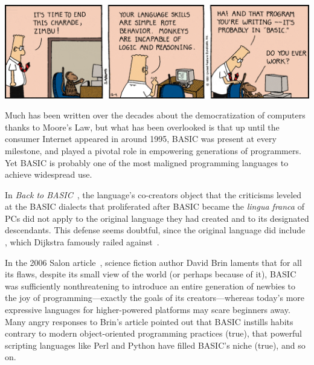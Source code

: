 

\includegraphics[width=\textwidth]{figs/dilbert-1991-12-04.png}



Much has been written over the decades about the democratization of
computers thanks to Moore's Law, but what has been overlooked is that up
until the consumer Internet appeared in around 1995, BASIC was present
at every milestone, and played a pivotal role in empowering generations
of programmers.
Yet BASIC is probably one of the most maligned programming languages
to achieve widespread use.

In \emph{Back to BASIC}~\cite{backtobasic}, the language's co-creators
object that the criticisms leveled at the 
BASIC dialects that proliferated after BASIC became the
\emph{lingua franca} of PCs did not apply to the original language
they had created and to its designated descendants.
This defense seems doubtful, since the original language did include
, which Dijkstra famously railed
against~\cite{goto_considered_harmful}.

In the 2006 Salon article~\cite{why_johnny_cant_code},
science fiction author David Brin laments that for all its flaws, 
despite its small view of the world (or perhaps because of it), BASIC
was sufficiently nonthreatening to introduce an entire generation of
newbies to the joy of programming---exactly the goals of its
creators---whereas today's more expressive languages for higher-powered
platforms may scare beginners away.
Many angry responses to Brin's article pointed out that BASIC
instills habits contrary to modern object-oriented programming practices (true),
that powerful scripting languages like Perl and Python have filled BASIC's
niche (true), and so on.  

